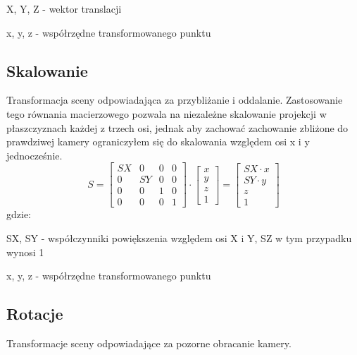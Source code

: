 \documentclass[11pt]{article}
\begin{document}
X, Y, Z - wektor translacji

x, y, z - współrzędne transformowanego punktu

\subsection{Skalowanie}
Transformacja sceny odpowiadająca za przybliżanie i oddalanie. 
Zastosowanie tego równania macierzowego pozwala na niezależne skalowanie 
projekcji w płaszczyznach każdej z trzech osi, jednak aby zachować zachowanie zbliżone
do prawdziwej kamery ograniczyłem się do skalowania względem osi x i y jednocześnie.
\begin{equation}
    S =
    \begin{bmatrix}
        SX & 0 & 0 & 0\\
        0 & SY & 0 & 0\\
        0 & 0 & 1 & 0\\
        0 & 0 & 0 & 1
    \end{bmatrix}
    \cdot
    \begin{bmatrix}
        x\\
        y\\
        z\\
        1
    \end{bmatrix}
    =
    \begin{bmatrix}
        SX \cdot x\\
        SY \cdot y\\
        z\\
        1
    \end{bmatrix}
\end{equation}
gdzie:

SX, SY - współczynniki powiększenia względem osi X i Y, SZ w tym przypadku wynosi 1

x, y, z - współrzędne transformowanego punktu

\subsection{Rotacje}
Transformacje sceny odpowiadające za pozorne obracanie kamery.
\end{document}
